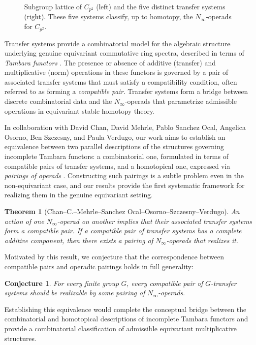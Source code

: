\documentclass[11pt]{article}
\newtheorem{theorem}{Theorem}
\newtheorem*{conjecture}{Conjecture}
\begin{document}
\begin{figure}[h]
\captionsetup{font=footnotesize} %
\caption{Subgroup lattice of $C_{p^2}$ (left) and the five distinct transfer systems (right). These five systems classify, up to homotopy, the $N_\infty$-operads for $C_{p^2}$.}
\label{fig:transferCp2}
\end{figure}

Transfer systems provide a combinatorial model for the algebraic structure underlying genuine equivariant commutative ring spectra, described in terms of {\it Tambara functors} \cite{MR1209937}.
The presence or absence of additive (transfer) and multiplicative (norm) operations in these functors is governed by a pair of associated transfer systems that must satisfy a compatibility condition, often referred to as forming a {\it compatible pair}.
Transfer systems form a bridge between discrete combinatorial data and the $N_\infty$-operads that parametrize admissible operations in equivariant stable homotopy theory.

In collaboration with David Chan, David Mehrle, Pablo Sanchez Ocal, Angelica Osorno, Ben Szczesny, and Paula Verdugo, our work aims to establish an equivalence between two parallel descriptions of the structures governing incomplete Tambara functors:
a combinatorial one, formulated in terms of compatible pairs of transfer systems, and a homotopical one, expressed via {\it pairings of operads} \cite{MR2544392}.
Constructing such pairings is a subtle problem even in the non-equivariant case, and our results provide the first systematic framework for realizing them in the genuine equivariant setting.

\begin{theorem}[Chan–C.–Mehrle–Sanchez Ocal–Osorno–Szczesny–Verdugo]
An action of one $N_\infty$-operad on another implies that their associated transfer systems form a compatible pair.
If a compatible pair of transfer systems has a complete additive component, then there exists a pairing of $N_\infty$-operads that realizes it.
\end{theorem}

Motivated by this result, we conjecture that the correspondence between compatible pairs and operadic pairings holds in full generality:
\begin{conjecture}
 For every finite group $G$, every compatible pair of $G$-transfer systems should be realizable by some pairing of $N_\infty$-operads.
\end{conjecture}
Establishing this equivalence would complete the conceptual bridge between the combinatorial and homotopical descriptions of incomplete Tambara functors and provide a combinatorial classification of admissible equivariant multiplicative structures.
\end{document}
